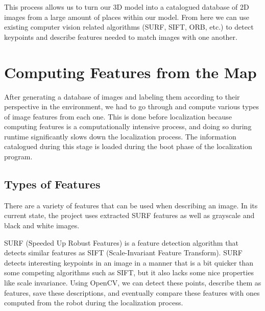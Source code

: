 \documentclass[a4paper,11pt]{article}
\begin{document}
  This process allows us to turn our 3D model into a catalogued database of 2D images from a large amount of places within our model. From here we can use existing computer vision related algorithms (SURF, SIFT, ORB, etc.) to detect keypoints and describe features needed to match images with one another.























  \section{Computing Features from the Map}
After generating a database of images and labeling them according to their perspective in the environment, we had to go through and compute various types of image features from each one. This is done before localization because computing features is a computationally intensive process, and doing so during runtime significantly slows down the localization process. The information catalogued during this stage is loaded during the boot phase of the localization program.

  \subsection{Types of Features}
There are a variety of features that can be used when describing an image. In its current state, the project uses extracted SURF features as well as grayscale and black and white images.

SURF (Speeded Up Robust Features) is a feature detection algorithm that detects similar features as SIFT (Scale-Invariant Feature Transform). SURF detects interesting keypoints in an image in a manner that is a bit quicker than some competing algorithms such as SIFT, but it also lacks some nice properties like scale invariance. Using OpenCV, we can detect these points, describe them as features, save these descriptions, and eventually compare these features with ones computed from the robot during the localization process.
\end{document}

